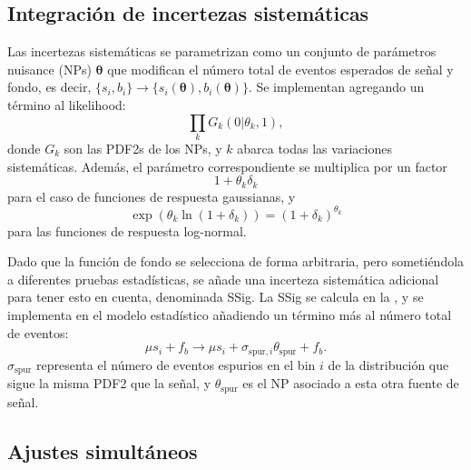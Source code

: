 \subsection{Integración de incertezas sistemáticas}
\label{subsec:strategy:stat_treatment:systs}

Las incertezas sistemáticas se parametrizan como un conjunto de parámetros nuisance (\acp{NP}) \(\mathbf{\theta}\) que modifican el número total de eventos esperados de señal y fondo, es decir, \(\{s_i, b_i\} \to \{s_i(\mathbf{\theta}), b_i(\mathbf{\theta})\}\). Se implementan agregando un término al likelihood:
\begin{equation}
    \prod_{k} G_k(0 | \theta_k, 1),
\end{equation}
donde \(G_k\) son las \acp{PDF2} de los \acp{NP}, y \(k\) abarca todas las variaciones sistemáticas. Además, el parámetro correspondiente se multiplica por un factor
\begin{equation}
    1 + \theta_k \delta_k
\end{equation}
para el caso de funciones de respuesta gaussianas, y
\begin{equation}
    \exp\left( \theta_k \ln\left(1 + \delta_k\right) \right) = \left(1 + \delta_k\right)^{\theta_k}
\end{equation}
para las funciones de respuesta log-normal.

Dado que la función de fondo se selecciona de forma arbitraria, pero sometiéndola a diferentes pruebas estadísticas, se añade una incerteza sistemática adicional para tener esto en cuenta, denominada \acf{SSig}. La \ac{SSig} se calcula en la \Sect{\ref{subsubsec:bkg:modeling:sigbkg:sstest}}, y se implementa en el modelo estadístico añadiendo un término más al número total de eventos:
\begin{equation}
    \mu s_i + f_b \to \mu s_i + \sigma_{\text{spur}, i} \theta_{\text{spur}} + f_b.
\end{equation}
\(\sigma_{\text{spur}}\) representa el número de eventos espurios en el bin \(i\) de la distribución que sigue la misma \ac{PDF2} que la señal, y \(\theta_{\text{spur}}\) es el \ac{NP} asociado a esta otra fuente de señal.

\subsection{Ajustes simultáneos}
\label{subsec:strategy:stat_treatment:simult_fits}

